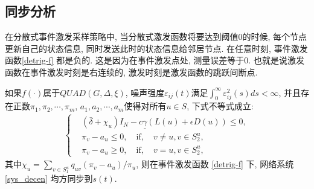\subsection{同步分析}
        \begin{rem}
            在分散式事件激发采样策略中, 当分散式激发函数将要达到阈值$0$的时候, 每个节点更新自己的状态信息, 同时发送此时的状态信息给邻居节点. 在任意时刻, 事件激发函数\eqref{detrig-f} 都是负的. 这是因为在事件激发点处, 测量误差等于$0$. 也就是说激发函数在事件激发时刻是右连续的, 激发时刻是激发函数的跳跃间断点.
        \end{rem}
        \begin{thm}\label{thm:decen}
            如果$f(\cdot)$属于$QUAD(G,\Delta,\xi)$, 噪声强度$\varepsilon_{ij}(t)$满足$\int_0^\infty\varepsilon_{ij}^2(s)ds<\infty$, 并且存在正数$\pi_1,\pi_2,\cdots,\pi_m$, $a_1,a_2,\cdots,a_m$使得对所有$u\in S$, 下式不等式成立:
            \begin{align}\label{de-condiction}
            \left\{
            \begin{aligned}
                  &(\bar{\delta}+\chi_u)I_N-c\underline{\gamma}(L(u)+\epsilon D(u))\leq0,\\
                  &\pi_v-a_u\leq0, \quad \text{if},\quad v\neq u, v\in S^u_2,\\
                  &\pi_v-a_u\geq0, \quad \text{if}, \quad v= u, v\in S^u_2,
            \end{aligned}
            \right.
            \end{align}
        其中$\chi_u=\sum_{v\in S_1^u}q_{uv}(\pi_v-a_u)/\pi_u$, 则在事件激发函数 \eqref{detrig-f} 下, 网络系统 \eqref{sys_decen} 均方同步到$s(t)$.
        \end{thm}
